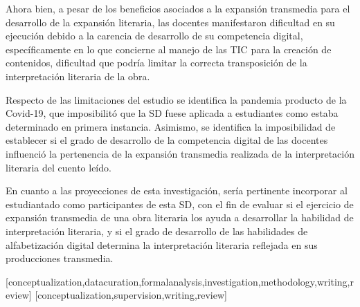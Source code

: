\documentclass[spanish]{textolivre}
\begin{document}
Ahora bien, a pesar de los beneficios asociados a la expansión transmedia para el desarrollo de la expansión literaria, las docentes manifestaron dificultad en su ejecución debido a la carencia de desarrollo de su competencia digital, específicamente en lo que concierne al manejo de las TIC para la creación de contenidos, dificultad que podría limitar la correcta transposición de la interpretación literaria de la obra.

Respecto de las limitaciones del estudio se identifica la pandemia producto de la Covid-19, que imposibilitó que la SD fuese aplicada a estudiantes como estaba determinado en primera instancia. Asimismo, se identifica la imposibilidad de establecer si el grado de desarrollo de la competencia digital de las docentes influenció la pertenencia de la expansión transmedia realizada de la interpretación literaria del cuento leído.

En cuanto a las proyecciones de esta investigación, sería pertinente incorporar al estudiantado como participantes de esta SD, con el fin de evaluar si el ejercicio de expansión transmedia de una obra literaria los ayuda a desarrollar la habilidad de interpretación literaria, y si el grado de desarrollo de las habilidades de alfabetización digital determina la interpretación literaria reflejada en sus producciones transmedia. 


\printbibliography\label{sec-bib}


\begin{contributors}
[conceptualization,datacuration,formalanalysis,investigation,methodology,writing,review]
[conceptualization,supervision,writing,review]
\end{contributors}
\end{document}
